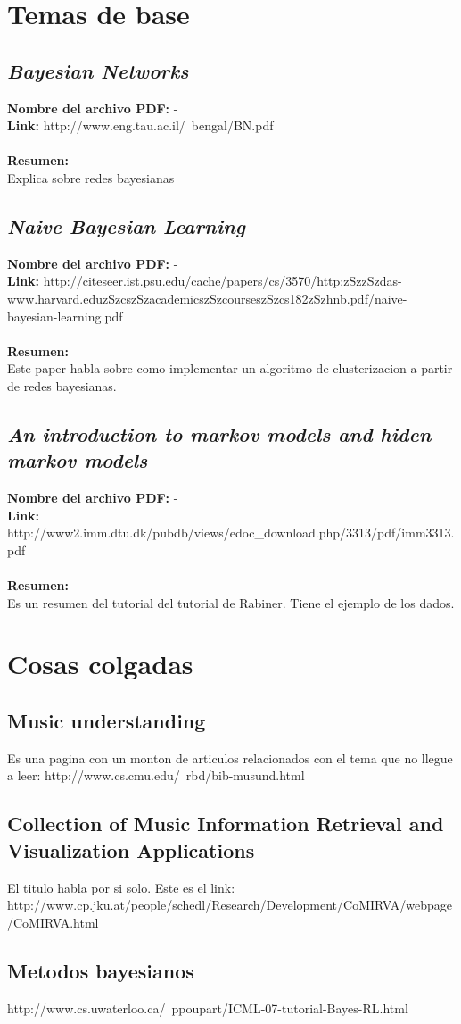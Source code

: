\documentclass[a4paper,10pt]{article}
\newcommand{\titulo}[1]{\def\Titulo{#1}}
\newcommand{\resumen}[1]{\def\Resumen{#1}}
\newcommand{\link}[1]{\def\Link{#1}}
\newenvironment{resumenpaper}{
\let\Titulo\empty
\let\Resumen\empty
\let\Archivo-
\let\Link-
\let\Id\empty
}{
\subsection{\textit{\Titulo}}
\label{\Id}
\noindent \textbf{Nombre del archivo PDF: }{\Archivo}\\
\noindent \textbf{Link: }{\Link}\\ \\
\noindent \textbf{Resumen:} \\ {\Resumen}
}
\begin{document}
\section{Temas de base}
\begin{resumenpaper}
 \titulo{Bayesian Networks}
 \link{http://www.eng.tau.ac.il/~bengal/BN.pdf}
 \resumen{Explica sobre redes bayesianas}
\end{resumenpaper}

\begin{resumenpaper}
 \titulo{Naive Bayesian Learning}
 \link{http://citeseer.ist.psu.edu/cache/papers/cs/3570/http:zSzzSzdas-www.harvard.eduzSzcszSzacademicszSzcourseszSzcs182zSzhnb.pdf/naive-bayesian-learning.pdf}
 \resumen{Este paper habla sobre como implementar un algoritmo de clusterizacion a partir de redes bayesianas.}
\end{resumenpaper}

\begin{resumenpaper}
 \titulo{An introduction to markov models and hiden markov models}
 \link{http://www2.imm.dtu.dk/pubdb/views/edoc\_download.php/3313/pdf/imm3313.pdf}
 \resumen{Es un resumen del tutorial del tutorial de Rabiner. Tiene el ejemplo de los dados.}
\end{resumenpaper}


\section{Cosas colgadas}
\subsection{Music understanding}
Es una pagina con un monton de articulos relacionados con el tema que no llegue a leer: http://www.cs.cmu.edu/~rbd/bib-musund.html

\subsection{Collection of Music Information Retrieval and Visualization Applications}
El titulo habla por si solo. Este es el link: \newline http://www.cp.jku.at/people/schedl/Research/Development/CoMIRVA/webpage/CoMIRVA.html

\subsection{Metodos bayesianos}
http://www.cs.uwaterloo.ca/~ppoupart/ICML-07-tutorial-Bayes-RL.html
\end{document}
